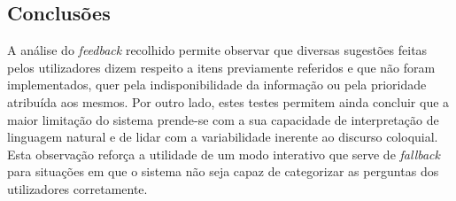 \documentclass[11pt, a4paper]{article}
\begin{document}
\subsection{Conclusões}

A análise do \textit{feedback} recolhido permite observar que diversas sugestões feitas pelos utilizadores
dizem respeito a itens previamente referidos e que não foram implementados, quer pela indisponibilidade da
informação ou pela prioridade atribuída aos mesmos. Por outro lado, estes testes permitem ainda concluir
que a maior limitação do sistema prende-se com a sua capacidade de interpretação de linguagem natural e de
lidar com a variabilidade inerente ao discurso coloquial. Esta observação reforça a utilidade de um modo
interativo que serve de \textit{fallback} para situações em que o sistema não seja capaz de categorizar
as perguntas dos utilizadores corretamente.
\end{document}
